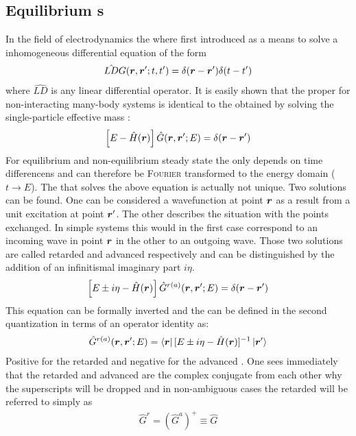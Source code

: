\subsection{Equilibrium \cgfnc s}
In the field of electrodynamics the \gfnc{} where first introduced as a means to solve a inhomogeneous differential equation of the form
\begin{align}
\hat{LD}G(\boldsymbol{r},\boldsymbol{r}';t,t') = \delta(\boldsymbol{r}-\boldsymbol{r}')\delta(t-t')
\label{eqn:lineardiff}
\end{align}
where $\hat{LD}$ is any linear differential operator. It  is easily shown that the proper \gfnc{} for non-interacting many-body systems is identical to the \gfnc{} obtained by solving the single-particle effective mass \sdg{} \cite{ferry1999transport}:
\begin{align}
\left[ E -\hat{H}(\boldsymbol{r})\right] \hat{G}(\boldsymbol{r},\boldsymbol{r}';E) = \delta (\boldsymbol{r}-\boldsymbol{r}')
\end{align}
For equilibrium \cite{fetter2003quantum} and non-equilibrium steady state \cite{haug2008quantum} the \gfnc{} only depends on time differencens and can therefore be \textsc{Fourier} transformed to the energy domain ($t \rightarrow E$). The \gfnc{} that solves the above equation is actually not unique. Two solutions can be found. One can be considered a wavefunction at point $\boldsymbol{r}$ as a result from a unit excitation at point $\boldsymbol{r}'$. The other describes the situation with the points exchanged. In simple systems this would in the first case correspond to an incoming wave in point $\boldsymbol{r}$ in the other to an outgoing wave.
Those two solutions are called retarded and advanced \gfnc{} respectively and can be distinguished by the addition of an infinitismal imaginary part $i\eta$.
\begin{align}
\left[ E \pm i \eta -\hat{H}(\boldsymbol{r})\right] \hat{G}^{r(a)}(\boldsymbol{r},\boldsymbol{r}';E) = \delta (\boldsymbol{r}-\boldsymbol{r}')
\end{align}
This equation can be formally inverted and the \gfnc{} can be defined in the second quantization in terms of an operator identity as:
\begin{align}
\hat{G}^{r(a)}(\boldsymbol{r},\boldsymbol{r}';E) = \left< \boldsymbol{r} \right| [E\pm i \eta - \hat{H}(\boldsymbol{r})]^{-1} \left| \boldsymbol{r}' \right>
\end{align}
Positive for the retarded and negative for the advanced \gfnc{}. One sees immediately that the retarded and advanced \gfnc{} are the complex conjugate from each other why the superscripts will be dropped and in non-ambiguous cases the retarded \gfnc{} will be referred to simply as \gfnc{}
\begin{align}
\hat{G}^r = (\hat{G}^a)^+ \equiv \hat{G}
\end{align}
